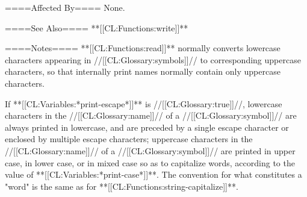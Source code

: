 ====Affected By====
None.

====See Also====
**[[CL:Functions:write]]**

====Notes====
**[[CL:Functions:read]]** normally converts lowercase characters appearing in //[[CL:Glossary:symbols]]// to corresponding uppercase characters, so that internally print names normally contain only uppercase characters.

If **[[CL:Variables:*print-escape*]]** is //[[CL:Glossary:true]]//, lowercase characters in the //[[CL:Glossary:name]]// of a //[[CL:Glossary:symbol]]// are always printed in lowercase, and are preceded by a single escape character or enclosed by multiple escape characters; uppercase characters in the //[[CL:Glossary:name]]// of a //[[CL:Glossary:symbol]]// are printed in upper case, in lower case, or in mixed case so as to capitalize words, according to the value of **[[CL:Variables:*print-case*]]**. The convention for what constitutes a "word" is the same as for **[[CL:Functions:string-capitalize]]**.

  
